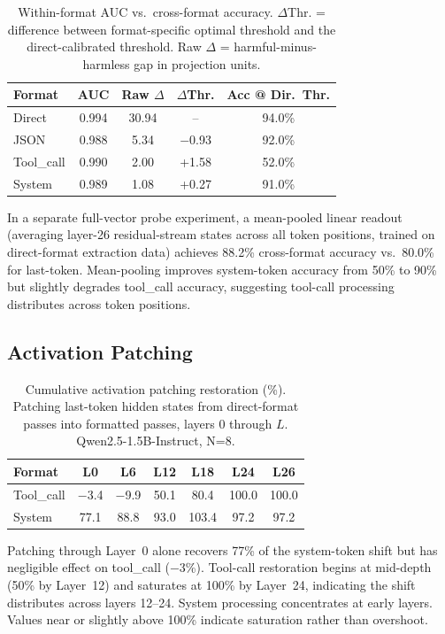\documentclass[conference]{IEEEtran}
\begin{document}
\begin{table}[t]
\caption{Within-format AUC vs.\ cross-format accuracy. $\Delta$Thr. = difference between format-specific optimal threshold and the direct-calibrated threshold. Raw $\Delta$ = harmful-minus-harmless gap in projection units.}
\label{tab:calibration}
\centering
\small
\begin{tabular}{lcccc}
\toprule
Format & AUC & Raw $\Delta$ & $\Delta$Thr. & Acc @ Dir.~Thr. \\
\midrule
Direct & 0.994 & 30.94 & -- & 94.0\% \\
JSON & 0.988 & 5.34 & $-$0.93 & 92.0\% \\
Tool\_call & 0.990 & 2.00 & +1.58 & 52.0\% \\
System & 0.989 & 1.08 & +0.27 & 91.0\% \\
\bottomrule
\end{tabular}
\end{table}

In a separate full-vector probe experiment, a mean-pooled linear readout (averaging layer-26 residual-stream states across all token positions, trained on direct-format extraction data) achieves 88.2\% cross-format accuracy vs.\ 80.0\% for last-token. Mean-pooling improves system-token accuracy from 50\% to 90\% but slightly degrades tool\_call accuracy, suggesting tool-call processing distributes across token positions.

\subsection{Activation Patching}
\label{sec:patching}

\begin{table}[t]
\caption{Cumulative activation patching restoration (\%). Patching last-token hidden states from direct-format passes into formatted passes, layers 0 through $L$. Qwen2.5-1.5B-Instruct, N=8.}
\label{tab:patching}
\centering
\small
\begin{tabular}{lcccccc}
\toprule
Format & L0 & L6 & L12 & L18 & L24 & L26 \\
\midrule
Tool\_call & $-$3.4 & $-$9.9 & 50.1 & 80.4 & 100.0 & 100.0 \\
System & 77.1 & 88.8 & 93.0 & 103.4 & 97.2 & 97.2 \\
\bottomrule
\end{tabular}
\end{table}

Patching through Layer~0 alone recovers 77\% of the system-token shift but has negligible effect on tool\_call ($-$3\%). Tool-call restoration begins at mid-depth (50\% by Layer~12) and saturates at 100\% by Layer~24, indicating the shift distributes across layers 12--24. System processing concentrates at early layers. Values near or slightly above 100\% indicate saturation rather than overshoot.
\end{document}
